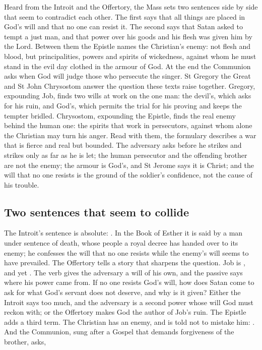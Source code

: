 \label{sec:armour-under-providence}

Heard from the Introit and the Offertory, the Mass sets two sentences side by
side that seem to contradict each other. The first says that all things are
placed in God's will and that no one can resist it. The second says that Satan
asked to tempt a just man, and that power over his goods and his flesh was given
him by the Lord. Between them the Epistle names the Christian's enemy: not flesh
and blood, but principalities, powers and spirits of wickedness, against whom he
must stand in the evil day clothed in the armour of God. At the end the Communion
asks when God will judge those who persecute the singer. St Gregory the Great
and St John Chrysostom answer the question these texts raise together. Gregory,
expounding Job, finds two wills at work on the one man: the devil's, which
asks for his ruin, and God's, which permits the trial for his proving and keeps
the tempter bridled. Chrysostom, expounding the Epistle, finds the real enemy
behind the human one: the spirits that work in persecutors, against whom alone
the Christian may turn his anger. Read with them, the formulary describes a war
that is fierce and real but bounded. The adversary asks before he strikes and
strikes only as far as he is let; the human persecutor and the offending brother
are not the enemy; the armour is God's, and St Jerome says it is Christ; and the
will that no one resists is the ground of the soldier's confidence, not the
cause of his trouble.

\subsection{Two sentences that seem to collide}

The Introit's sentence is absolute: . In the Book of
Esther it is said by a man under sentence of death, whose people a royal decree
has handed over to its enemy; he confesses the will that no one resists while
the enemy's will seems to have prevailed. The Offertory tells a story that
sharpens the question. Job is , and yet
. The verb
 gives the adversary a will of his own, and the passive  says where his power came from. If no one resists God's will,
how does Satan come to ask for what God's servant does not deserve, and why is
it given? Either the Introit says too much, and the adversary is a second power
whose will God must reckon with; or the Offertory makes God the author of Job's
ruin. The Epistle adds a third term. The Christian has an enemy, and is told not
to mistake him: .
And the Communion, sung after a Gospel that demands forgiveness of the brother,
asks, 

